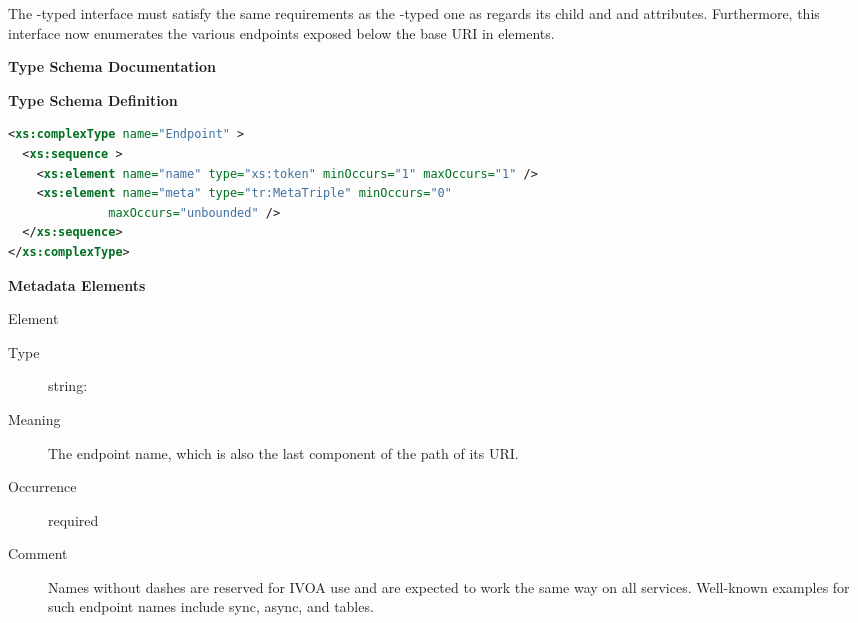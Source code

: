 \documentclass{ivoa}
\begin{document}

The -typed interface must satisfy the same
requirements as the -typed one as regards its
 child and  and  attributes.
Furthermore, this interface now enumerates the various endpoints exposed
below the base URI in  elements.

\begin{generated}
\begingroup
        \renewcommand*\descriptionlabel[1]{%
        \hbox to 5.5em{\emph{#1}\hfil}}\vspace{2ex}\noindent\textbf{ Type Schema Documentation}



\vspace{1ex}\noindent\textbf{ Type Schema Definition}

\begin{lstlisting}[language=XML,basicstyle=\footnotesize]
<xs:complexType name="Endpoint" >
  <xs:sequence >
    <xs:element name="name" type="xs:token" minOccurs="1" maxOccurs="1" />
    <xs:element name="meta" type="tr:MetaTriple" minOccurs="0"
              maxOccurs="unbounded" />
  </xs:sequence>
</xs:complexType>
\end{lstlisting}

\vspace{0.5ex}\noindent\textbf{ Metadata Elements}

\begingroup\small\begin{bigdescription}\item[Element \xmlel{name}]
\begin{description}
\item[Type] string: 
\item[Meaning] The endpoint name, which is also the last component of the
            path of its URI.
\item[Occurrence] required
\item[Comment] Names without dashes are reserved for IVOA use and are expected to
            work the same way on all services.  Well-known examples for
            such endpoint names include sync, async, and tables.


\end{description}
\end{bigdescription}
\end{generated}
\end{document}
